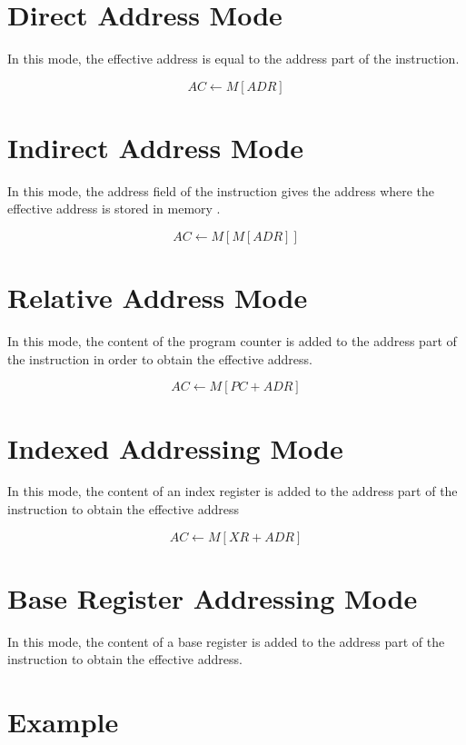 \documentclass[12pt]{article}
\begin{document}
\section{Direct Address Mode}
In this mode, the effective address is equal to the address part of the instruction. 

$$
AC \leftarrow M[ADR]
$$

\section{Indirect Address Mode}
In this mode, the address field of the instruction gives the address where the effective address is stored in memory .


$$
AC \leftarrow M[M[ADR]]
$$

\section{Relative Address Mode}
In this mode, the content of the program counter is added to the address part of the instruction in order to obtain the effective address.

$$
AC \leftarrow M[PC + ADR]
$$

\section{Indexed Addressing Mode}
In this mode, the content of an index register is added to the address part of the instruction to obtain the effective address 

$$
AC \leftarrow M[XR + ADR]
$$

\section{Base Register Addressing Mode}
In this mode, the content of a base register is added to the address part of the instruction to obtain the effective address.

\section{Example}
\end{document}
